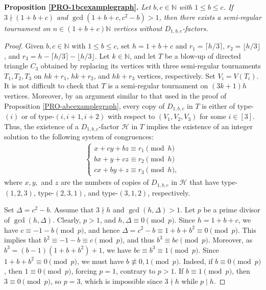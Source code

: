 \documentclass[11pt,a4paper,reqno]{amsart}
\theoremstyle{definition} %
\begin{document}
\medskip
\noindent \textbf{Proposition \ref{PRO-1bcexamplegraph}.} 
\textit{Let $b,c\in \mathbb{N}$ with $1\leqslant b\leqslant c$.  If $3\nmid (1+b+c)$ and $\gcd(1+b+c,c^2-b)> 1$, then there exists a semi-regular tournament on $n\in(1+b+c)\mathbb{N}$ vertices without $D_{1,b,c}$-factors.}


\begin{proof}
Given $b,c\in \mathbb{N}$ with $1\leqslant b\leqslant c$, set $h=1+b+c$ and
$r_1=\lceil h/3\rceil$, $r_2=\lfloor h/3\rfloor$, and
$r_3=h-\lceil h/3\rceil-\lfloor h/3\rfloor$.
Let $k \in \mathbb{N}$, and let $T$ be a blow-up of directed triangle $C_3$ obtained by replacing its vertices with three semi-regular tournaments $T_1, T_2, T_3$ on $hk+r_1$, $hk+r_2$, and $hk+r_3$ vertices, respectively. Set $V_i=V(T_i)$. It is not difficult to check that $T$ is a semi-regular tournament on $(3k+1)h$ vertices. Moreover, by an argument similar to that used in the proof of Proposition \ref{PRO-abcexamplegraph}, every copy of $D_{1,b,c}$ in $T$ is either of type-$(i)$ or of type-$(i,i+1,i+2)$ with respect to $(V_1,V_2,V_3)$ for some $i\in[3]$. Thus, the existence of a $D_{1,b,c}$-factor $\mathcal{H}$ in $T$ implies the existence of an integer solution to the following system of congruences:
\begin{align}\label{system of 1bc}
\begin{cases}
x+cy+bz\equiv r_1 \pmod h\\
bx+y+cz\equiv r_2 \pmod h\\
cx+by+z\equiv r_3 \pmod h,
\end{cases}
\end{align}
where $x,y,$ and $z$ are the numbers of copies of $D_{1,b,c}$ in $\mathcal{H}$ that have type-$(1,2,3)$, type-$(2,3,1)$, and type-$(3,1,2)$, respectively.

Set $\Delta=c^2-b$. Assume that $3\nmid h$ and $\gcd(h, \Delta)> 1$. Let $p$ be a prime divisor of $\gcd(h,\Delta)$. Clearly, $p>1$, 
and $h,\Delta\equiv 0\pmod p$. Since $h=1+b+c$, we have $c\equiv-1-b\pmod{p}$, and hence
$\Delta=c^2-b\equiv 1+b+b^2\equiv0\pmod{p}$.
This implies that $b^2\equiv-1-b\equiv c\pmod{p}$, and thus $b^3 \equiv bc \pmod{p}$. Moreover, as $b^3=(b-1)(1+b+b^2)+1$, we have
$bc\equiv b^3 \equiv  1 \pmod{p}$. Since $1+b+b^2\equiv 0\pmod{p}$, we must have $b\not\equiv 0,1\pmod{p}$. Indeed, if $b\equiv 0\pmod{p}$, then $1\equiv 0\pmod{p}$, forcing $p=1$, contrary to $p>1$. If $b\equiv 1\pmod{p}$, then $3\equiv 0\pmod{p}$, so $p=3$, which is impossible since $3\nmid h$ while $p\mid h$.





\end{proof}
\end{document}
